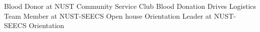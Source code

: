 %
%
%


\begin{scholarship}
					{Blood Donor at NUST Community Service Club Blood Donation Drives}
					{Logistics Team Member at NUST-SEECS Open house}
					{Orientation Leader at NUST-SEECS Orientation }
					
  \emptySeparator
  \emptySeparator
  
\end{scholarship}